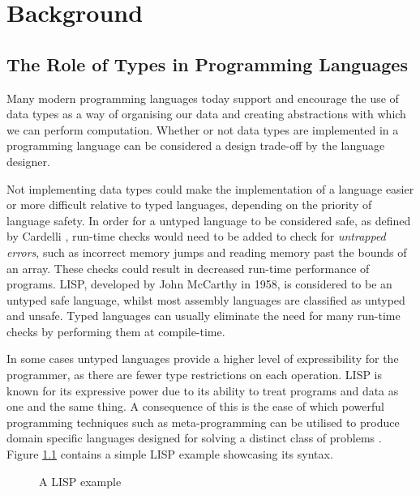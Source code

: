 \documentclass{UoYCSproject}
\begin{document}
\chapter{Background}

\section{The Role of Types in Programming Languages}
Many modern programming languages today support and encourage the use of data
types as a way of organising our data and creating abstractions with which
we can perform computation. Whether or not data types are implemented in a
programming language can be considered a design trade-off by the language
designer.

Not implementing data types could make the implementation of a language easier
or more difficult relative to typed languages, depending on the priority of
language safety. In order for a untyped language to be considered safe, as
defined by Cardelli \cite[p.~3]{CSHandbook}, run-time checks would need to be added
to check for \textit{untrapped errors}, such as incorrect memory jumps and
reading memory past the bounds of an array. These checks could result in
decreased run-time performance of programs. LISP, developed by John McCarthy in
1958, is considered to be an untyped safe language, whilst most assembly
languages are classified as untyped and unsafe. Typed languages can usually
eliminate the need for many run-time checks by performing them at compile-time.

In some cases untyped languages provide a higher level of expressibility for
the programmer, as there are fewer type restrictions on each operation.
LISP is known for its expressive power due to its ability to treat programs and
data as one and the same thing. A consequence of this is the ease of which
powerful programming techniques such as meta-programming can be utilised to
produce domain specific languages designed for solving a distinct class of
problems \cite[\S1, p.~5]{SICP}. Figure \ref{fig:SimpleTypedLanguages} contains a
simple LISP example showcasing its syntax.

\begin{figure}
    
    \caption{A LISP example}
    \label{fig:SimpleTypedLanguages}
\end{figure}
\end{document}
